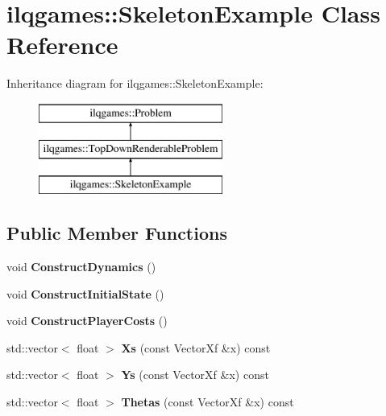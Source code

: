 \hypertarget{classilqgames_1_1_skeleton_example}{}\section{ilqgames\+:\+:Skeleton\+Example Class Reference}
\label{classilqgames_1_1_skeleton_example}
Inheritance diagram for ilqgames\+:\+:Skeleton\+Example\+:\begin{figure}[H]
\begin{center}
\leavevmode
\includegraphics[height=3.000000cm]{classilqgames_1_1_skeleton_example}
\end{center}
\end{figure}
\subsection*{Public Member Functions}
\begin{DoxyCompactItemize}
\item 
void {\bfseries Construct\+Dynamics} ()\hypertarget{classilqgames_1_1_skeleton_example_af9f624a72077345bdabdd175245363ff}{}\label{classilqgames_1_1_skeleton_example_af9f624a72077345bdabdd175245363ff}

\item 
void {\bfseries Construct\+Initial\+State} ()\hypertarget{classilqgames_1_1_skeleton_example_ac879ec2a6d35145a1822d5260a20cf28}{}\label{classilqgames_1_1_skeleton_example_ac879ec2a6d35145a1822d5260a20cf28}

\item 
void {\bfseries Construct\+Player\+Costs} ()\hypertarget{classilqgames_1_1_skeleton_example_af8e5884df786c6dddf072d9e37e5397c}{}\label{classilqgames_1_1_skeleton_example_af8e5884df786c6dddf072d9e37e5397c}

\item 
std\+::vector$<$ float $>$ {\bfseries Xs} (const Vector\+Xf \&x) const \hypertarget{classilqgames_1_1_skeleton_example_ae0e9ad0a27e485e28e9ca3728df72470}{}\label{classilqgames_1_1_skeleton_example_ae0e9ad0a27e485e28e9ca3728df72470}

\item 
std\+::vector$<$ float $>$ {\bfseries Ys} (const Vector\+Xf \&x) const \hypertarget{classilqgames_1_1_skeleton_example_a09b34bb53952b9d151d61e94e8471fe4}{}\label{classilqgames_1_1_skeleton_example_a09b34bb53952b9d151d61e94e8471fe4}

\item 
std\+::vector$<$ float $>$ {\bfseries Thetas} (const Vector\+Xf \&x) const \hypertarget{classilqgames_1_1_skeleton_example_a3f62282748531798d1f821d8e937f2c6}{}\label{classilqgames_1_1_skeleton_example_a3f62282748531798d1f821d8e937f2c6}

\end{DoxyCompactItemize}
